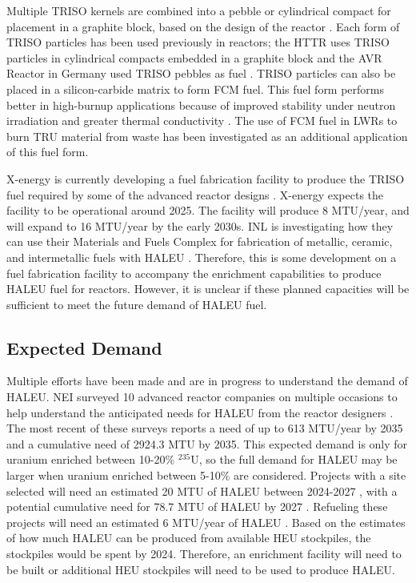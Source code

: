 Multiple \gls{TRISO} kernels are combined into a pebble or 
cylindrical compact for placement in a graphite block, based on the 
design of the reactor \cite{demkowicz_coated_2019}. Each form of 
\gls{TRISO} particles has been used previously in reactors; the \gls{HTTR}
uses 
\gls{TRISO} particles in cylindrical compacts embedded in a graphite block 
\cite{shiozawa_overview_2004} and the AVR Reactor in Germany used 
\gls{TRISO} pebbles as fuel \cite{gottaut_results_1990}.
\gls{TRISO} particles can also be placed in a silicon-carbide matrix 
to form \gls{FCM} fuel. This fuel form performs better in high-burnup 
applications because of improved stability under neutron irradiation and 
greater thermal conductivity \cite{snead_fully_2011}. The use of 
\gls{FCM} fuel in \glspl{LWR} to burn \gls{TRU} material from waste 
has been investigated \cite{snead_fully_2011,venneri_fully_2011} as 
an additional application of this fuel form. 

X-energy is currently developing a fuel fabrication facility to 
produce the \gls{TRISO} fuel required by some of the advanced 
reactor designs \cite{x-energy_triso-x_2022}. X-energy expects the 
facility to be operational around 2025. The facility will 
produce 8 MTU/year, and will expand to 16 MTU/year 
by the early 2030s. \gls{INL} is investigating 
how they can use their Materials and Fuels Complex for 
fabrication of metallic, ceramic, and intermetallic fuels with 
\gls{HALEU} \cite{crawford_fuel_2019}. Therefore, this is some development 
on a fuel fabrication facility to accompany the enrichment 
capabilities to produce \gls{HALEU} fuel for reactors. However, 
it is unclear if these planned capacities will be sufficient to 
meet the future demand of \gls{HALEU} fuel. 

\subsection{Expected Demand}
Multiple efforts have been made and are in progress to understand the 
demand of \gls{HALEU}. \gls{NEI} surveyed 10 advanced reactor 
companies on multiple occasions to help understand the anticipated needs
for \gls{HALEU} from the reactor designers 
\cite{korsnick_need_2018,korsnick_updated_2020,korsnick_updated_2021}. 
The most recent of these surveys \cite{korsnick_updated_2021} reports 
a need of up to 613 MTU/year by 2035 and a cumulative need of 2924.3 MTU 
by 2035. This expected demand is only for uranium enriched between 10-20\%
$^{235}$U, so the full demand for \gls{HALEU} may be larger when uranium 
enriched between 5-10\% are considered. Projects with a site selected 
will need an estimated 20 MTU of \gls{HALEU} between 2024-2027 
\cite{nuclear_energy_institute_establishing_2022}, with a potential cumulative 
need for 78.7 MTU of \gls{HALEU} by 2027 \cite{korsnick_updated_2021}. 
Refueling these projects will need an estimated 6 MTU/year of 
\gls{HALEU} \cite{nuclear_energy_institute_establishing_2022}. Based 
on the estimates of how much \gls{HALEU} can be produced from available 
\gls{HEU} stockpiles, the stockpiles would be spent by 2024. Therefore, 
an enrichment facility will need to be built or additional \gls{HEU} 
stockpiles will need to be used to produce \gls{HALEU}.

